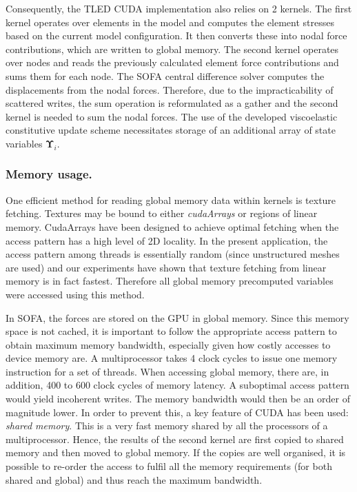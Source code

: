 Consequently, the TLED CUDA implementation also relies on 2 kernels. The first kernel operates over elements in the model and computes the element stresses based on the current model configuration. It then converts these into nodal force contributions, which are written to global memory. The second kernel operates over nodes and reads the previously calculated element force contributions and sums them for each node. The SOFA central difference solver computes the displacements from the nodal forces. Therefore, due to the impracticability of scattered writes, the sum operation is reformulated as a gather and the second kernel is needed to sum the nodal forces. The use of the developed viscoelastic constitutive update scheme necessitates storage of an additional array of state variables $ \boldsymbol \Upsilon_i $.

\subsubsection*{Memory usage.}
One efficient method for reading global memory data within kernels is texture fetching. Textures may be bound to either \emph{cudaArrays} or regions of linear memory. CudaArrays have been designed to achieve optimal fetching when the access pattern has a high level of 2D locality. In the present application, the access pattern among threads is essentially random (since unstructured meshes are used) and our experiments have shown that texture fetching from linear memory is in fact fastest. Therefore all global memory precomputed variables were accessed using this method.

In SOFA, the forces are stored on the GPU in global memory. Since this memory space is not cached, it is important to follow the appropriate access pattern to obtain maximum memory bandwidth, especially given how costly accesses to device memory are. A multiprocessor takes 4 clock cycles to issue one memory instruction for a set of threads. When accessing global memory, there are, in addition, 400 to 600 clock cycles of memory latency. A suboptimal access pattern would yield incoherent writes. The memory bandwidth would then be an order of magnitude lower. In order to prevent this, a key feature of CUDA has been used: \emph{shared memory}. This is a very fast memory shared by all the processors of a multiprocessor. Hence, the results of the second kernel are first copied to shared memory and then moved to global memory. If the copies are well organised, it is possible to re-order the access to fulfil all the memory requirements (for both shared and global) and thus reach the maximum bandwidth.

